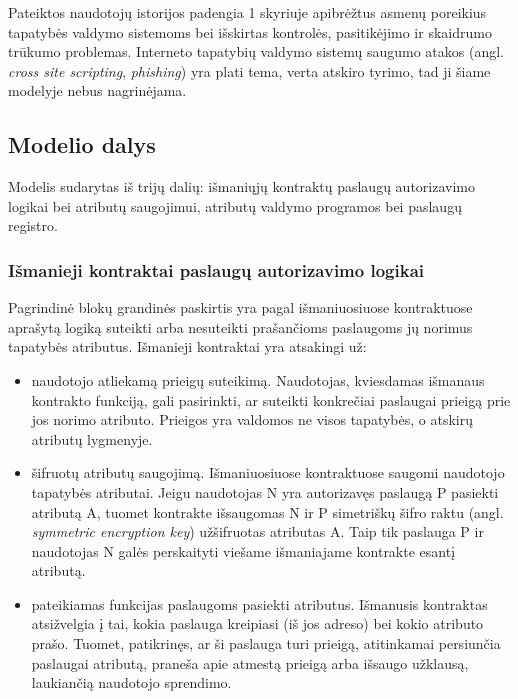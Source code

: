 Pateiktos naudotojų istorijos padengia 1 skyriuje apibrėžtus asmenų poreikius tapatybės valdymo
sistemoms bei išskirtas kontrolės, pasitikėjimo ir skaidrumo trūkumo problemas. Interneto tapatybių valdymo sistemų saugumo atakos (angl.
\textit{cross site scripting}, \textit{phishing}) yra plati tema, verta atskiro tyrimo, tad ji šiame modelyje nebus nagrinėjama.

\subsection{Modelio dalys}

Modelis sudarytas iš trijų dalių: išmaniųjų kontraktų paslaugų autorizavimo logikai bei atributų saugojimui,
atributų valdymo programos bei paslaugų registro.

\subsubsection{Išmanieji kontraktai paslaugų autorizavimo logikai} \label{BCIDM:blockchainFunctions}

Pagrindinė blokų grandinės paskirtis yra pagal išmaniuosiuose kontraktuose aprašytą logiką suteikti arba nesuteikti
prašančioms paslaugoms jų norimus tapatybės atributus. Išmanieji kontraktai yra atsakingi už:

\begin{itemize}
    \item naudotojo atliekamą prieigų suteikimą. Naudotojas, kviesdamas išmanaus kontrakto funkciją, gali pasirinkti,
    ar suteikti konkrečiai paslaugai prieigą prie jos norimo atributo. Prieigos yra valdomos ne visos tapatybės, o
    atskirų atributų lygmenyje.

    \item šifruotų atributų saugojimą. Išmaniuosiuose kontraktuose saugomi naudotojo tapatybės atributai. Jeigu naudotojas N
    yra autorizavęs paslaugą P pasiekti atributą A, tuomet kontrakte išsaugomas N ir P simetriškų šifro raktu (angl.
    \textit{symmetric encryption key}) užšifruotas atributas A. Taip tik paslauga P
    ir naudotojas N galės perskaityti viešame išmaniajame kontrakte esantį atributą.

    \item pateikiamas funkcijas paslaugoms pasiekti atributus. Išmanusis kontraktas atsižvelgia į tai, kokia paslauga kreipiasi (iš
    jos adreso) bei kokio atributo prašo. Tuomet, patikrinęs, ar ši paslauga turi prieigą, atitinkamai persiunčia
    paslaugai atributą, praneša apie atmestą prieigą arba išsaugo užklausą, laukiančią naudotojo sprendimo.
\end{itemize}

